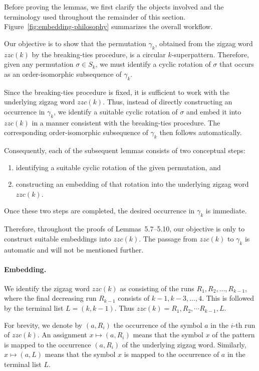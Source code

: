 \documentclass[a4paper,12pt]{article}
\theoremstyle{definition}
\numberwithin{equation}{section}
\begin{document}
Before proving the lemmas, we first clarify the objects involved and the terminology used throughout the remainder of this section. Figure~\ref{fig:embedding-philosophy} summarizes the overall workflow.

Our objective is to show that the permutation $\gamma_k$, obtained from the zigzag word $zzc(k)$ by the breaking-ties procedure, is a circular $k$-superpattern. Therefore, given any permutation $\sigma\in S_k$, we must identify a cyclic rotation of $\sigma$ that occurs as an order-isomorphic subsequence of $\gamma_k$.

Since the breaking-ties procedure is fixed, it is sufficient to work with the underlying zigzag word $zzc(k)$. Thus, instead of directly constructing an occurrence in $\gamma_k$, we identify a suitable cyclic rotation of $\sigma$ and embed it into $zzc(k)$ in a manner consistent with the breaking-ties procedure. The corresponding order-isomorphic subsequence of $\gamma_k$ then follows automatically.

Consequently, each of the subsequent lemmas consists of two conceptual steps:
\begin{enumerate}
    \item identifying a suitable cyclic rotation of the given permutation, and
    \item constructing an embedding of that rotation into the underlying zigzag word $zzc(k)$.
\end{enumerate}

Once these two steps are completed, the desired occurrence in $\gamma_k$ is immediate.

Therefore, throughout the proofs of Lemmas~5.7--5.10, our objective is only to construct suitable embeddings into $zzc(k)$. The passage from $zzc(k)$ to $\gamma_k$ is automatic and will not be mentioned further.

\paragraph{Embedding.}
We identify the zigzag word $zzc(k)$ as consisting of the runs
$R_1,R_2,\ldots,R_{k-1}$,
where the final decreasing run $R_{k-1}$ consists of
$k-1,k-3,\ldots,4$.
This is followed by the terminal list
$L=(k,k-1)$. Thus $zzc(k) = R_1,R_2, \cdots R_{k-1},L$.

For brevity, we denote by $(a,R_i)$ the occurrence of the symbol $a$ in the
$i$-th run of $zzc(k)$. An assignment
$x\mapsto(a,R_i)$
means that the symbol $x$ of the pattern is mapped to the occurrence $(a,R_i)$
of the underlying zigzag word. Similarly,
$x\mapsto(a,L)$
means that the symbol $x$ is mapped to the occurrence of $a$ in the terminal list $L$.
\end{document}
